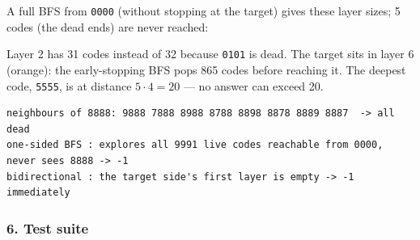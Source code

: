 \begin{tracebox}
A full BFS from \texttt{0000} (without stopping at the target) gives these layer sizes; 5 codes (the dead ends) are never reached:
\begin{center}
\end{center}
Layer 2 has 31 codes instead of 32 because \texttt{0101} is dead. The target sits in layer 6 (orange): the early-stopping BFS pops 865 codes before reaching it. The deepest code, \texttt{5555}, is at distance $5\cdot4 = 20$ --- no answer can exceed 20.
\end{tracebox}

\begin{tracebox}
\begin{lstlisting}[style=trace]
neighbours of 8888: 9888 7888 8988 8788 8898 8878 8889 8887  -> all dead
one-sided BFS : explores all 9991 live codes reachable from 0000, never sees 8888 -> -1
bidirectional : the target side's first layer is empty -> -1 immediately
\end{lstlisting}
\end{tracebox}

\subsubsection*{6. Test suite}

